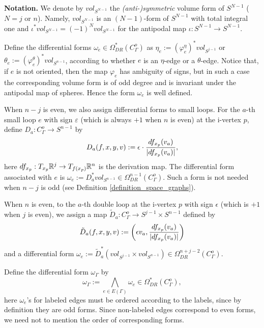 \noindent
{\bf Notation.}
We denote by $vol_{S^{N-1}}$ the {\em (anti-)symmetric} volume form of $S^{N-1}$ ($N=j$ or $n$).
Namely, $vol_{S^{N-1}}$ is an $(N-1)$-form of $S^{N-1}$ with total integral one and
$\iota^* vol_{S^{N-1}} = (-1)^N vol_{S^{N-1}}$ for the antipodal map $\iota : S^{N-1} \to S^{N-1}$.

\smallskip

Define the differential forms $\omega_e \in \Omega^*_{DR}(C^o_{\Gamma})$ as
$\eta_e := (\varphi^{\eta}_e )^* vol_{S^{j-1}}$ or $\theta_e := (\varphi^{\theta}_e )^* vol_{S^{n-1}}$,
according to whether $e$ is an $\eta$-edge or a $\theta$-edge.
Notice that, if $e$ is not oriented, then the map $\varphi_e$ has ambiguity of signs, but in such a case the
corresponding volume form is of odd degree and is invariant under the antipodal map of spheres.
Hence the form $\omega_e$ is well defined.


When $n-j$ is even, we also assign differential forms to small loops.
For the $a$-th small loop $e$ with sign $\varepsilon$ (which is always $+1$ when $n$ is even) at the i-vertex $p$,
define $D_a : C^o_{\Gamma} \to S^{n-1}$ by
\[
 D_a (f,x,y,v) := \epsilon \cdot \frac{df_{x_p}(v_a )}{\lvert {df_{x_p}(v_a )} \rvert},
\]
here $df_{x_p} : T_{x_p}\mathbb{R}^j \to T_{f(x_p )}\mathbb{R}^n$ is the derivation map.
The differential form associated with $e$ is $\omega_e :=D^*_a vol_{S^{n-1}} \in \Omega^{n-1}_{DR}(C^o_{\Gamma})$.
Such a form is not needed when $n-j$ is odd (see Definition \ref{definition_space_graphs}).


When $n$ is even, to the $a$-th double loop at the i-vertex $p$ with sign $\epsilon$ (which is $+1$ when $j$ is even),
we assign a map $\tilde{D}_a : C^o_{\Gamma} \to S^{j-1} \times S^{n-1}$ defined by
\[
 \tilde{D}_a (f,x,y,v):= \left( \epsilon v_a , \frac{df_{x_p}(v_a )}{\lvert {df_{x_p}(v_a )} \rvert}\right)
\]
and a differential form
$\omega_e :=\tilde{D}_a^* (vol_{S^{j-1}} \times vol_{S^{n-1}})\in \Omega^{n+j-2}_{DR}(C^o_{\Gamma})$.


Define the differential form $\omega_{\Gamma}$ by
\[
 \omega_{\Gamma} := \bigwedge_{e \in E(\Gamma )}\omega_e \in \Omega^*_{DR} (C^o_{\Gamma}),
\]
here $\omega_e$'s for labeled edges must be ordered according to the labels, since by definition they are odd forms.
Since non-labeled edges correspond to even forms, we need not to mention the order of corresponding forms.





